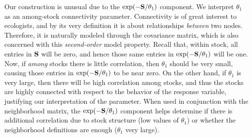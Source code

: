 \documentclass[11pt, titlepage]{article}\usepackage[]{graphicx}\usepackage[]{color}
\begin{document}
\begin{spacing}{1.9}
\begin{flushleft}
Our construction is unusual due to the $\exp(-\mathbf{S}/\theta_1)$ component.  We interpret $\theta_1$ as an among-stock connectivity parameter.  Connectivity is of great interest to ecologists, and by its very definition it is about relationships \emph{between} two nodes.  Therefore, it is naturally modeled through the covariance matrix, which is also concerned with this \emph{second-order} model property.  Recall that, within stock, all entries in $\mathbf{S}$ will be zero, and hence those same entries in $\exp(-\mathbf{S}/\theta_1)$ will be one.  Now, if \emph{among} stocks there is little correlation, then $\theta_1$ should be very small, causing those entries in $\exp(-\mathbf{S}/\theta_1)$ to be near zero.  On the  other hand, if $\theta_1$ is very large, then there will be high correlation among stocks, and thus the stocks are highly connected with respect to the behavior of the response variable, justifying our interpretation of the parameter.  When used in conjunction with the neighborhood matrix, the $\exp(-\mathbf{S}/\theta_1)$ component helps determine if there is additional correlation due to stock structure (low values of $\theta_1$) or whether the neighborhood definitions are enough ($\theta_1$ very large).


\end{flushleft}
\end{spacing}
\end{document}
